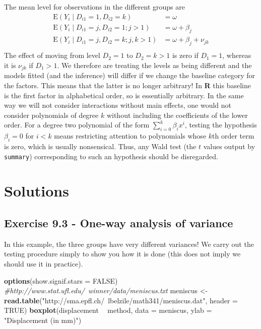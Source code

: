 \documentclass[]{book}
\newenvironment{Shaded}{\begin{snugshade}}{\end{snugshade}}
\newcommand{\CommentTok}[1]{\textcolor[rgb]{0.56,0.35,0.01}{\textit{#1}}}
\newcommand{\DataTypeTok}[1]{\textcolor[rgb]{0.13,0.29,0.53}{#1}}
\newcommand{\KeywordTok}[1]{\textcolor[rgb]{0.13,0.29,0.53}{\textbf{#1}}}
\newcommand{\NormalTok}[1]{#1}
\newcommand{\OperatorTok}[1]{\textcolor[rgb]{0.81,0.36,0.00}{\textbf{#1}}}
\newcommand{\OtherTok}[1]{\textcolor[rgb]{0.56,0.35,0.01}{#1}}
\newcommand{\StringTok}[1]{\textcolor[rgb]{0.31,0.60,0.02}{#1}}
\theoremstyle{definition}
\theoremstyle{definition}
\theoremstyle{definition}
\theoremstyle{remark}
\begin{document}
The mean level for observations in the different groups are
\begin{align*}
\mathrm{E}(Y_i \mid D_{i1}=1, D_{i2}=k) &= \omega \\
\mathrm{E}(Y_i \mid D_{i1}=j, D_{i2}=1; j > 1) &= \omega + \beta_j \\
\mathrm{E}(Y_i \mid D_{i1}=j, D_{i2}=k; j, k > 1) &= \omega + \beta_j + \nu_{jk} \\
\end{align*} The effect of moving from level \(D_{2}=1\) to
\(D_{2}=k>1\) is zero if \(D_{1}=1\), whereas it is \(\nu_{jk}\) if
\(D_{1}>1\). We therefore are treating the levels as being different and
the models fitted (and the inference) will differ if we change the
baseline category for the factors. This means that the latter is no
longer arbitrary! In \textbf{R} this baseline is the first factor in
alphabetical order, so is essentially arbitrary. In the same way we will
not consider interactions without main effects, one would not consider
polynomials of degree \(k\) without including the coefficients of the
lower order. For a degree two polynomial of the form
\(\sum_{i=0}^k \beta_ix^i\), testing the hypothesis \(\beta_i=0\) for
\(i < k\) means restricting attention to polynomials whose \(k\)th order
term is zero, which is usually nonsensical. Thus, any Wald test (the
\(t\) values output by \texttt{summary}) corresponding to such an
hypothesis should be disregarded.

\hypertarget{solutions-4}{%
\section{Solutions}\label{solutions-4}}

\hypertarget{exercise-9.3---one-way-analysis-of-variance}{%
\subsection{Exercise 9.3 - One-way analysis of
variance}\label{exercise-9.3---one-way-analysis-of-variance}}

In this example, the three groups have very different variances! We
carry out the testing procedure simply to show you how it is done (this
does not imply we should use it in practice).

\begin{Shaded}
\begin{Highlighting}[]
\KeywordTok{options}\NormalTok{(}\DataTypeTok{show.signif.stars =} \OtherTok{FALSE}\NormalTok{)}
\CommentTok{#http://www.stat.ufl.edu/~winner/data/meniscus.txt}
\NormalTok{meniscus <-}\StringTok{ }\KeywordTok{read.table}\NormalTok{(}\StringTok{"http://sma.epfl.ch/~lbelzile/math341/meniscus.dat"}\NormalTok{, }\DataTypeTok{header =} \OtherTok{TRUE}\NormalTok{)}
\KeywordTok{boxplot}\NormalTok{(displacement }\OperatorTok{~}\StringTok{ }\NormalTok{method, }\DataTypeTok{data =}\NormalTok{ meniscus, }\DataTypeTok{ylab =} \StringTok{"Displacement (in mm)"}\NormalTok{)}
\end{Highlighting}
\end{Shaded}
\end{document}
